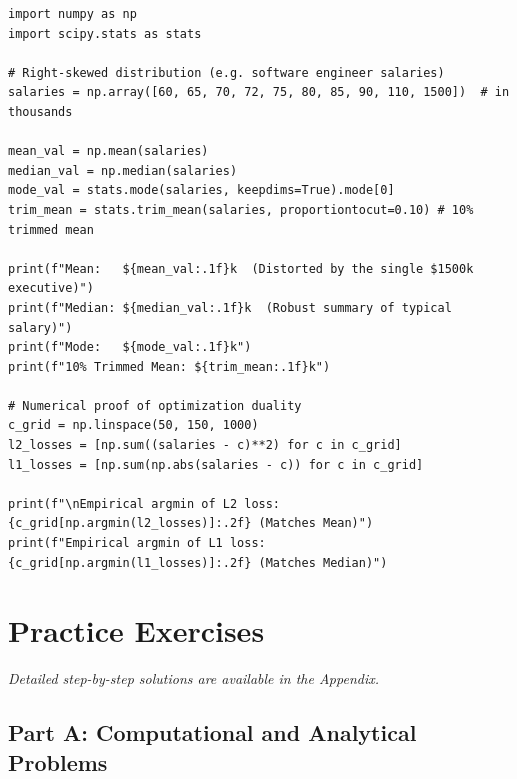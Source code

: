 \begin{lstlisting}[caption={Central Tendency and Loss Minimization in Python}]
import numpy as np
import scipy.stats as stats

# Right-skewed distribution (e.g. software engineer salaries)
salaries = np.array([60, 65, 70, 72, 75, 80, 85, 90, 110, 1500])  # in thousands

mean_val = np.mean(salaries)
median_val = np.median(salaries)
mode_val = stats.mode(salaries, keepdims=True).mode[0]
trim_mean = stats.trim_mean(salaries, proportiontocut=0.10) # 10% trimmed mean

print(f"Mean:   ${mean_val:.1f}k  (Distorted by the single $1500k executive)")
print(f"Median: ${median_val:.1f}k  (Robust summary of typical salary)")
print(f"Mode:   ${mode_val:.1f}k")
print(f"10% Trimmed Mean: ${trim_mean:.1f}k")

# Numerical proof of optimization duality
c_grid = np.linspace(50, 150, 1000)
l2_losses = [np.sum((salaries - c)**2) for c in c_grid]
l1_losses = [np.sum(np.abs(salaries - c)) for c in c_grid]

print(f"\nEmpirical argmin of L2 loss: {c_grid[np.argmin(l2_losses)]:.2f} (Matches Mean)")
print(f"Empirical argmin of L1 loss: {c_grid[np.argmin(l1_losses)]:.2f} (Matches Median)")
\end{lstlisting}

\newpage
\section{Practice Exercises}
\textit{Detailed step-by-step solutions are available in the Appendix.}

\subsection*{Part A: Computational and Analytical Problems}


